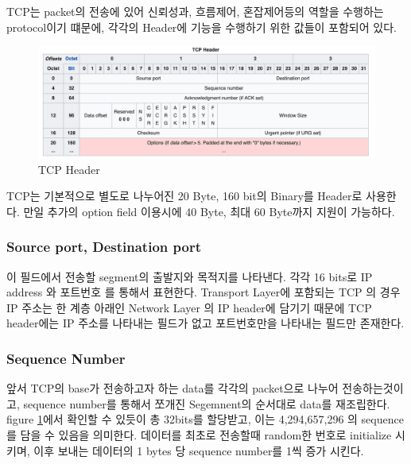     TCP는 packet의 전송에 있어 신뢰성과, 흐름제어, 혼잡제어등의 역할을 수행하는 protocol이기 떄문에, 
    각각의 Header에 기능을 수행하기 위한 값들이 포함되어 있다. \\
    \vspace{-4mm}  
        \begin{figure}[!h]\centering
    		\includegraphics[width=.9\textwidth]{image/week01/1-1-1.png}
    		\caption{\small TCP Header}
    		\label{fig:TCP}
    		\vspace{-10pt}
        \end{figure}

    TCP는 기본적으로 별도로 나누어진 20 Byte, 160 bit의 Binary를 Header로 사용한다.  
    만일 추가의 option field 이용시에 40 Byte, 최대 60 Byte까지 지원이 가능하다. 
\newpage
    \subsubsection*{Source port, Destination port}
        이 필드에서 전송할 segment의 출발지와 목적지를 나타낸다. 
        각각 16 bits로 IP address 와 포트번호 를 통해서 표현한다. 
        Transport Layer에 포함되는 TCP 의 경우 IP 주소는 한 계층 아래인  Network Layer 의 IP header에 담기기 때문에 TCP header에는 IP 주소를 나타내는 필드가 없고 포트번호만을 나타내는 필드만 존재한다.
    \subsubsection*{Sequence Number}
        앞서 TCP의 base가 전송하고자 하는 data를 각각의 packet으로 나누어 전송하는것이고, 
        sequence number를 통해서 쪼개진 Segemnent의  순서대로 data를 재조립한다. 
        figure \ref{fig:TCP}에서 확인할 수 있듯이 총 32bits를 할당받고, 이는 4,294,657,296 의 sequence를 담을 수 있음을 의미한다. 
        데이터를 최초로 전송할때 random한 번호로 initialize 시키며, 이후 보내는 데이터의 1 bytes 당 sequence number를 1씩 증가 시킨다.
